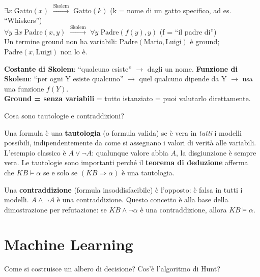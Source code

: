 \documentclass[12pt,a4paper]{article}
\begin{document}
\begin{esempiobox}
$\exists x\; \text{Gatto}(x)$ $\xrightarrow{\text{Skolem}}$ $\text{Gatto}(k)$ \quad (k = nome di un gatto specifico, ad es. ``Whiskers'')\\
$\forall y\; \exists x\; \text{Padre}(x, y)$ $\xrightarrow{\text{Skolem}}$ $\forall y\; \text{Padre}(f(y), y)$ \quad (f = ``il padre di'')\\
Un termine ground non ha variabili: $\text{Padre}(\text{Mario}, \text{Luigi})$ è ground; $\text{Padre}(x, \text{Luigi})$ non lo è.
\end{esempiobox}

\begin{ricordabox}
\textbf{Costante di Skolem}: ``qualcuno esiste'' $\to$ dagli un nome. \textbf{Funzione di Skolem}: ``per ogni Y esiste qualcuno'' $\to$ quel qualcuno dipende da Y $\to$ usa una funzione $f(Y)$.\\
\textbf{Ground = senza variabili} = tutto istanziato = puoi valutarlo direttamente.
\end{ricordabox}

\begin{domandabox}{Cosa sono tautologie e contraddizioni?}
\end{domandabox}

Una formula è una \textbf{tautologia} (o formula valida) se è vera in \emph{tutti} i modelli possibili, indipendentemente da come si assegnano i valori di verità alle variabili. L'esempio classico è $A \lor \neg A$: qualunque valore abbia $A$, la disgiunzione è sempre vera. Le tautologie sono importanti perché il \textbf{teorema di deduzione} afferma che $KB \models \alpha$ se e solo se $(KB \Rightarrow \alpha)$ è una tautologia.

Una \textbf{contraddizione} (formula insoddisfacibile) è l'opposto: è falsa in tutti i modelli. $A \land \neg A$ è una contraddizione. Questo concetto è alla base della dimostrazione per refutazione: se $KB \land \neg\alpha$ è una contraddizione, allora $KB \models \alpha$.

\section{Machine Learning}

\begin{domandabox}{Come si costruisce un albero di decisione? Cos'è l'algoritmo di Hunt?}
\end{domandabox}
\end{document}
